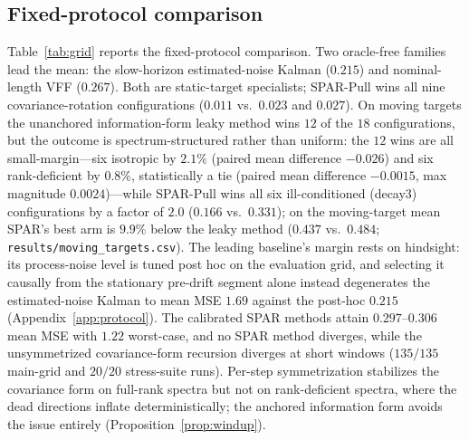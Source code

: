 \documentclass[10pt]{article}
\begin{document}
\subsection{Fixed-protocol comparison}
Table~\ref{tab:grid} reports the fixed-protocol comparison.
Two oracle-free families lead the mean: the slow-horizon estimated-noise Kalman ($0.215$) and nominal-length VFF ($0.267$).
Both are static-target specialists; SPAR-Pull wins all nine covariance-rotation configurations ($0.011$ vs.\ $0.023$ and $0.027$).
On moving targets the unanchored information-form leaky method wins $12$ of the $18$ configurations, but the outcome is spectrum-structured rather than uniform: the $12$ wins are all small-margin---six isotropic by $2.1\%$ (paired mean difference $-0.026$) and six rank-deficient by $0.8\%$, statistically a tie (paired mean difference $-0.0015$, max magnitude $0.0024$)---while SPAR-Pull wins all six ill-conditioned (decay3) configurations by a factor of $2.0$ ($0.166$ vs.\ $0.331$); on the moving-target mean SPAR's best arm is $9.9\%$ below the leaky method ($0.437$ vs.\ $0.484$; \texttt{results/moving\_targets.csv}).
The leading baseline's margin rests on hindsight: its process-noise level is tuned post hoc on the evaluation grid, and selecting it causally from the stationary pre-drift segment alone instead degenerates the estimated-noise Kalman to mean MSE $1.69$ against the post-hoc $0.215$ (Appendix~\ref{app:protocol}).
The calibrated SPAR methods attain $0.297$--$0.306$ mean MSE with $1.22$ worst-case, and no SPAR method diverges, while the unsymmetrized covariance-form recursion diverges at short windows ($135/135$ main-grid and $20/20$ stress-suite runs).
Per-step symmetrization stabilizes the covariance form on full-rank spectra \citep{bierman1977,sayed2008} but not on rank-deficient spectra, where the dead directions inflate deterministically; the anchored information form avoids the issue entirely (Proposition~\ref{prop:windup}).
\end{document}
